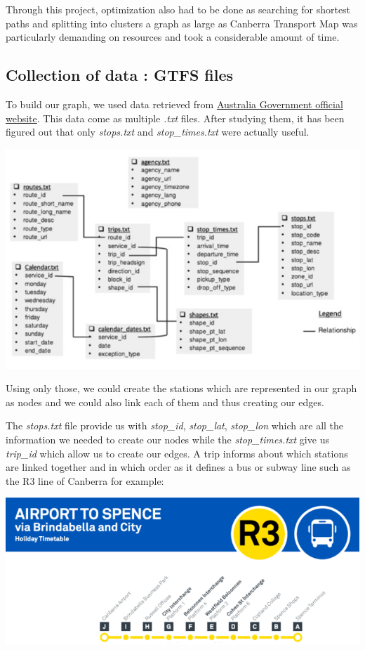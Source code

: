 \documentclass{article}
\begin{document}
	Through this project, optimization also had to be done as searching for shortest paths and splitting into clusters a graph as large as Canberra Transport Map was particularly demanding on resources and took a considerable amount of time.
	
\subsection{Collection of data : GTFS files}
	
	To build our graph, we used data retrieved from \href{https://www.transport.act.gov.au/contact-us/information-for-developers}{Australia Government official website}. This data come as multiple \textit{.txt} files. After studying them, it has been figured out that only \textit{stops.txt} and \textit{stop\_times.txt} were actually useful.
	
\begin{center}
\includegraphics[scale=1]{assets/data}
\end{center}

	Using only those, we could create the stations which are represented in our graph as nodes and we could also link each of them and thus creating our edges.
	
\newpage
	
	The \textit{stops.txt} file provide us with \textit{stop\_id},  \textit{stop\_lat}, \textit{stop\_lon} which are all the information we needed to create our nodes while the \textit{stop\_times.txt} give us \textit{trip\_id} which allow us to create our edges. A trip informs about which stations are linked together and in which order as it defines a bus or subway line such as the R3 line of Canberra for example:
\begin{center}
\includegraphics[scale=1]{assets/R3}
\end{center}
\end{document}
